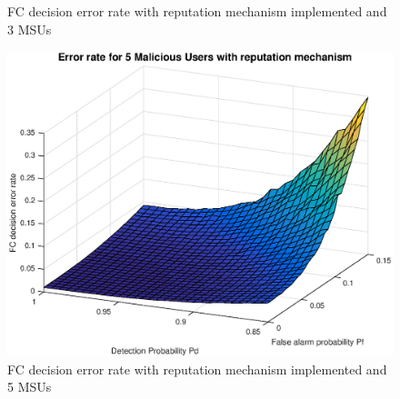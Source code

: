 \documentclass[letterpaper, 10 pt, conference]{ieeeconf}  %
\begin{document}
\begin{figure}[t]
\begin{minipage}[t]{0.32\textwidth}
        \caption{FC decision error rate with reputation mechanism implemented and 3 MSUs}
        \label{rm3}
    \end{minipage}
    \begin{minipage}[t]{0.32\textwidth}
        \centering
        \includegraphics[width=\linewidth]{figures/rm5mu.eps}
        \caption{FC decision error rate with reputation mechanism implemented and 5 MSUs}
        \label{rm5}
    \end{minipage}
    \end{figure}
\end{document}
